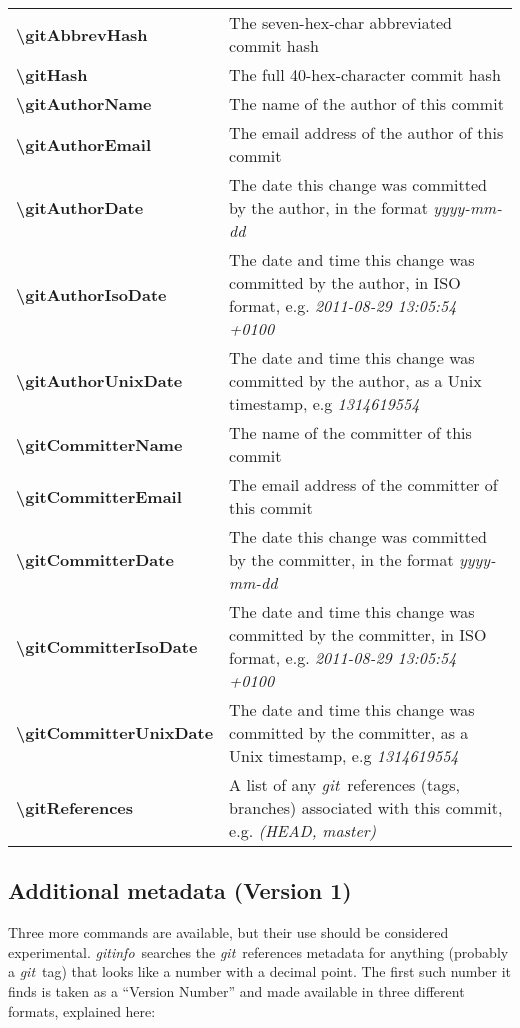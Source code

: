 \documentclass[a4paper,12pt,twoside,openany]{memoir}
\newcommand{\sfit}[1]{\textit{#1}}
\newcommand{\git}{\sfit{git}}
\newcommand{\tpname}{\sfit{gitinfo}}
\begin{document}
\noindent
\begin{tabularx}{\textwidth}{@{}>{\ttfamily\bfseries\textbackslash}lX@{}}
gitAbbrevHash&
    The seven-hex-char abbreviated commit hash
\\
gitHash&
    The full 40-hex-character commit hash
\\
gitAuthorName&
    The name of the author of this commit
\\
gitAuthorEmail&
    The email address of the author of this commit
\\
gitAuthorDate&
    The date this change was committed by the author,
    in the format \textit{yyyy-mm-dd}
\\
gitAuthorIsoDate&
    The date and time this change was committed by the author,
    in ISO format, e.g. \textit{2011-08-29 13:05:54 +0100}
\\
gitAuthorUnixDate&
    The date and time this change was committed by the author,
    as a Unix timestamp, e.g \textit{1314619554}
\\
gitCommitterName&
    The name of the committer of this commit
\\
gitCommitterEmail&
    The email address of the committer of this commit
\\
gitCommitterDate&
    The date this change was committed by the committer,
    in the format \textit{yyyy-mm-dd}
\\
gitCommitterIsoDate&
    The date and time this change was committed by the committer,
    in ISO format, e.g. \textit{2011-08-29 13:05:54 +0100}
\\
gitCommitterUnixDate&
    The date and time this change was committed by the committer,
    as a Unix timestamp, e.g \textit{1314619554}
\\
gitReferences&
    A list of any \git\ references (tags, branches) associated
    with this commit, e.g. \textit{ (HEAD, master)}
\\
\end{tabularx}


\subsection{Additional metadata (Version 1)}

Three more commands are available, but their use should be considered
experimental. \tpname\ searches the \git\ references metadata for
anything (probably a \git\ tag) that looks like a number with a decimal point.
The first such number it finds is taken as a ``Version Number''
and made available in three different formats, explained here:
\vspace{0.5\baselineskip}
\end{document}
